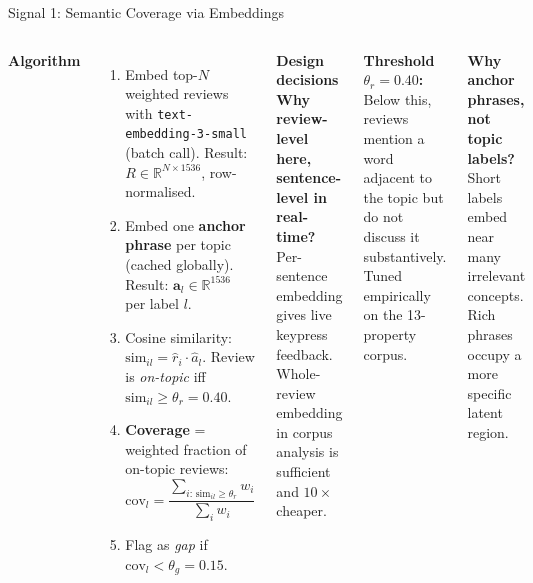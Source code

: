 \documentclass[aspectratio=169,10pt]{beamer}
\begin{document}
\begin{frame}{Signal 1: Semantic Coverage via Embeddings}
\begin{columns}[T]
\textbf{Algorithm}
\begin{enumerate}
  \item Embed top-$N$ weighted reviews with
        \texttt{text-embedding-3-small} (batch call).
        Result: $R \in \mathbb{R}^{N \times 1536}$, row-normalised.
  \item Embed one \textbf{anchor phrase} per topic (cached globally).
        Result: $\mathbf{a}_l \in \mathbb{R}^{1536}$ per label $l$.
  \item Cosine similarity: $\text{sim}_{il} = \hat{r}_i \cdot \hat{a}_l$.
        Review is \textit{on-topic} iff $\text{sim}_{il} \geq \theta_r = 0.40$.
  \item \textbf{Coverage} = weighted fraction of on-topic reviews:
        \[\text{cov}_l = \frac{\sum_{i:\,\text{sim}_{il}\geq\theta_r} w_i}{\sum_i w_i}\]
  \item Flag as \textit{gap} if $\text{cov}_l < \theta_g = 0.15$.
\end{enumerate}

\textbf{Design decisions}\\[0.3em]
\small
\textbf{Why review-level here, sentence-level in real-time?}
Per-sentence embedding gives live keypress feedback.
Whole-review embedding in corpus analysis is sufficient
and $10\times$ cheaper.

\medskip
\textbf{Threshold $\theta_r = 0.40$:}
Below this, reviews mention a word adjacent to the topic but do not
discuss it substantively.
Tuned empirically on the 13-property corpus.

\medskip
\textbf{Why anchor phrases, not topic labels?}
Short labels embed near many irrelevant concepts.
Rich phrases occupy a more specific latent region.
\end{columns}
\end{frame}
\end{document}

